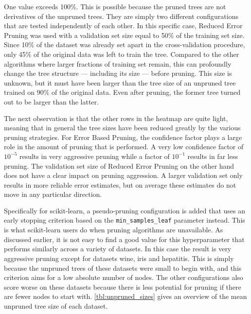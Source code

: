 One value exceeds 100\%. This is possible because the pruned trees are not derivatives of the unpruned trees. They are simply two different configurations that are tested independently of each other. In this specific case, Reduced Error Pruning was used with a validation set size equal to 50\% of the training set size. Since 10\% of the dataset was already set apart in the cross-validation procedure, only 45\% of the original data was left to train the tree. Compared to the other algorithms where larger fractions of training set remain, this can profoundly change the tree structure --- including its size --- before pruning. This size is unknown, but it must have been larger than the tree size of an unpruned tree trained on 90\% of the original data. Even after pruning, the former tree turned out to be larger than the latter.

The next observation is that the other rows in the heatmap are quite light, meaning that in general the tree sizes have been reduced greatly by the various pruning strategies. For Error Based Pruning, the confidence factor plays a large role in the amount of pruning that is performed. A very low confidence factor of $10^{-5}$ results in very aggressive pruning while a factor of $10^{-1}$ results in far less pruning. The validation set size of Reduced Error Pruning on the other hand does not have a clear impact on pruning aggression. A larger validation set only results in more reliable error estimates, but on average these estimates do not move in any particular direction.

Specifically for scikit-learn, a pseudo-pruning configuration is added that uses an early stopping criterion based on the \texttt{min\_samples\_leaf} parameter instead. This is what scikit-learn users do when pruning algorithms are unavailable. As discussed earlier, it is not easy to find a good value for this hyperparameter that performs similarly across a variety of datasets. In this case the result is very aggressive pruning except for datasets wine, iris and hepatitis. This is simply because the unpruned trees of these datasets were small to begin with, and this criterion aims for a low absolute number of nodes. The other configurations also score worse on these datasets because there is less potential for pruning if there are fewer nodes to start with. \autoref{tbl:unpruned_sizes} gives an overview of the mean unpruned tree size of each dataset.

